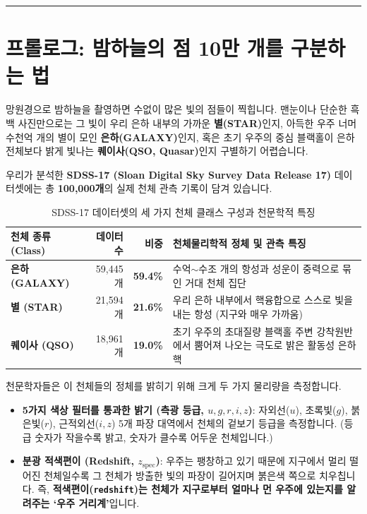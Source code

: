 \documentclass[11pt,a4paper]{article}
\begin{document}
\tableofcontents
\vspace{6pt}
\noindent\textcolor{BorderGray}{\rule{\textwidth}{0.6pt}}

\section{프롤로그: 밤하늘의 점 10만 개를 구분하는 법}

망원경으로 밤하늘을 촬영하면 수없이 많은 빛의 점들이 찍힙니다. 맨눈이나 단순한 흑백 사진만으로는 그 빛이 우리 은하 내부의 가까운 \textbf{별(STAR)}인지, 아득한 우주 너머 수천억 개의 별이 모인 \textbf{은하(GALAXY)}인지, 혹은 초기 우주의 중심 블랙홀이 은하 전체보다 밝게 빛나는 \textbf{퀘이사(QSO, Quasar)}인지 구별하기 어렵습니다.

우리가 분석한 \textbf{SDSS-17 (Sloan Digital Sky Survey Data Release 17)} 데이터셋에는 총 \textbf{100,000개}의 실제 천체 관측 기록이 담겨 있습니다.

\begin{table}[H]
\centering
\caption{SDSS-17 데이터셋의 세 가지 천체 클래스 구성과 천문학적 특징}
\label{tab:classes}
\small
\begin{tabularx}{\textwidth}{lrrX}
\toprule
\textbf{천체 종류 (Class)} & \textbf{데이터 수} & \textbf{비중} & \textbf{천체물리학적 정체 및 관측 특징} \\
\midrule
\textbf{은하 (GALAXY)} & 59,445개 & \textbf{59.4\%} & 수억$\sim$수조 개의 항성과 성운이 중력으로 묶인 거대 천체 집단 \\
\textbf{별 (STAR)} & 21,594개 & \textbf{21.6\%} & 우리 은하 내부에서 핵융합으로 스스로 빛을 내는 항성 (지구와 매우 가까움) \\
\textbf{퀘이사 (QSO)} & 18,961개 & \textbf{19.0\%} & 초기 우주의 초대질량 블랙홀 주변 강착원반에서 뿜어져 나오는 극도로 밝은 활동성 은하핵 \\
\bottomrule
\end{tabularx}
\end{table}

천문학자들은 이 천체들의 정체를 밝히기 위해 크게 두 가지 물리량을 측정합니다.

\begin{itemize}[leftmargin=16pt, itemsep=3pt]
  \item \textbf{5가지 색상 필터를 통과한 밝기 (측광 등급, $u, g, r, i, z$)}: 자외선($u$), 초록빛($g$), 붉은빛($r$), 근적외선($i, z$) 5개 파장 대역에서 천체의 겉보기 등급을 측정합니다. (등급 숫자가 작을수록 밝고, 숫자가 클수록 어두운 천체입니다.)
  \item \textbf{분광 적색편이 (Redshift, $z_{\text{spec}}$)}: 우주는 팽창하고 있기 때문에 지구에서 멀리 떨어진 천체일수록 그 천체가 방출한 빛의 파장이 길어지며 붉은색 쪽으로 치우칩니다. 즉, \textbf{적색편이(\texttt{redshift})는 천체가 지구로부터 얼마나 먼 우주에 있는지를 알려주는 `우주 거리계'}입니다.
\end{itemize}
\end{document}
